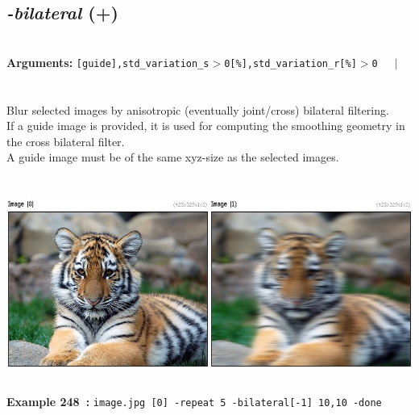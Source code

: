 \documentclass[a4paper,11pt,twoside]{book}
\begin{document}
\subsection{\emph{-bilateral} (+)}\vspace*{-0.5em}
~\\\textbf{Arguments: } 
{\small \texttt{[guide],std\_variation\_s$>$0[\%],std\_variation\_r[\%]$>$0}}~~~$|$\\
\\~\\
Blur selected images by anisotropic (eventually joint/cross) bilateral filtering.
~\\If a guide image is provided, it is used for computing the smoothing geometry in the cross bilateral filter.
~\\A guide image must be of the same xyz-size as the selected images.
\begin{center}\includegraphics[keepaspectratio=true,height=7cm,width=\textwidth]{img/gmic_def248.jpg}\\
{\footnotesize \textbf{Example 248~:} \texttt{image.jpg [0] -repeat 5 -bilateral[-1] 10,10 -done}}
\end{center}
\end{document}
